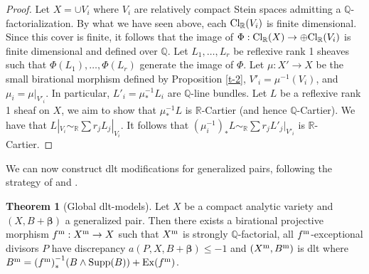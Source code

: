 \documentclass[11pt]{amsart}
\numberwithin{equation}{section}
\def\bbeta{\boldsymbol{\beta}}
\newcommand\Q{{\mathbb{Q}}}
\newcommand\R{{\mathbb{R}}}
\theoremstyle{definition}
\theoremstyle{definition}
\newtheorem{theorem}{Theorem}[section]
\theoremstyle{definition}
\begin{document}
\begin{proof}
Let $X=\cup V_i$ where $V_i$ are relatively compact Stein spaces admitting a $\Q$-factorialization. By what we have seen above, each ${\rm Cl}_\R(V_i)$ is finite dimensional. Since this cover is finite, it follows that the image of $\Phi:{\rm Cl}_\R(X)\to \oplus {\rm Cl}_\R(V_i)$ is finite dimensional and defined over $\Q$. Let $L_1,\ldots ,L_r$ be reflexive rank 1 sheaves such that $\Phi(L_1),\ldots , \Phi(L_r)$ generate the image of $\Phi$. Let $\mu:X'\to X$ be the small birational morphism defined by Proposition \ref{t-2}, $V'_i=\mu ^{-1}(V_i)$, and $\mu _i=\mu |_{V'_i}$. In particular, $L'_i=\mu ^{-1}_*L_i$ are $\Q$-line bundles.
Let $L$ be a reflexive rank 1 sheaf on $X$, we aim to show that $\mu ^{-1}_*L$ is $\R$-Cartier (and hence $\Q$-Cartier). We have that $L|_{V_i}\sim _\R \sum r_jL_j|_{V_i}$. It follows that $(\mu_i ^{-1})_*L\sim _\R \sum r_jL'_j|_{V'_i}$ is $\R$-Cartier.
\end{proof}
We can now construct dlt modifications for generalized pairs, following the strategy of \cite{Fil20} and \cite{HP24}.
\begin{theorem}[Global dlt-models]\label{t-dltmodel} 
Let $X$  be a compact analytic variety and  $(X,B+\bbeta )$ a generalized pair. Then there exists a birational projective morphism $f^{\rm m}:X^{\rm m}\to X$ such that $X^{\rm m}$ is strongly $\Q$-factorial, all $f^{\rm m}$-exceptional divisors $P$ have discrepancy $a(P,X,B+\bbeta )\leq -1$ and
 $(X^{\rm m}, B^{\rm m})$ is dlt where $B^{\rm m}={(f^{\rm m})}^{-1}_*(B\wedge {\rm Supp}(B))+{\rm Ex}(f^{\rm m})$.
\end{theorem}

\end{document}
